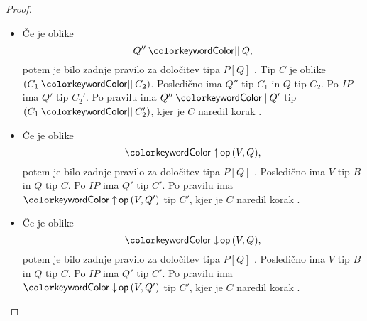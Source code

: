 \begin{proof}
\begin{itemize}
\begin{itemize}
			\item Če je oblike $$\tmpar{Q''}{Q},$$ potem je bilo zadnje pravilo za določitev tipa $P[Q]$ . Tip $C$ je oblike $\typar{C_1}{C_2}$.
			Posledično ima $Q''$ tip $C_1$ in $Q$ tip $C_2$.
			Po $IP$ ima $Q'$ tip $C_2'$.
			Po pravilu  ima $\tmpar{Q''}{Q'}$ tip $\typar{C_1}{C_2'}$, kjer je $C$ naredil korak .
			
			\item Če je oblike $$\tmopout{op}{V}{Q},$$ potem je bilo zadnje pravilo za določitev tipa $P[Q]$ .
			Posledično ima $V$ tip $B$ in $Q$ tip $C$.
			Po $IP$ ima $Q'$ tip $C'$.
			Po pravilu  ima $\tmopout{op}{V}{Q'}$ tip $C'$, kjer je $C$ naredil korak .
			
			\item Če je oblike $$\tmopin{op}{V}{Q},$$ potem je bilo zadnje pravilo za določitev tipa $P[Q]$ .
			Posledično ima $V$ tip $B$ in $Q$ tip $C$.
			Po $IP$ ima $Q'$ tip $C'$.
			Po pravilu  ima $\tmopin{op}{V}{Q'}$ tip $C'$, kjer je $C$ naredil korak .
		\end{itemize}
	
	\end{itemize}

\end{proof}


